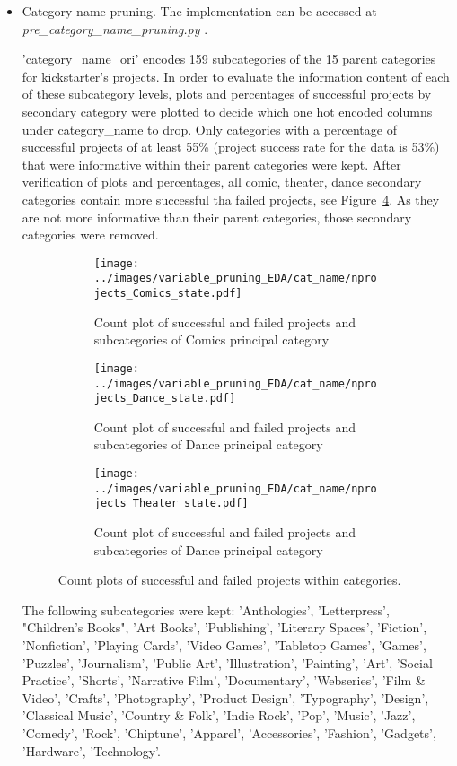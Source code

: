 \documentclass{article}
\begin{document}
{\begin{itemize}
\begin{itemize}
	\item Category name pruning.
	The implementation can be accessed at \emph{pre\_category\_name\_pruning.py }.
	
	'category\_name\_ori' encodes 159 subcategories of the 15 parent categories for kickstarter's projects. In order to evaluate the information content of each of these subcategory levels, plots and percentages of successful projects by secondary category were plotted to decide which one hot encoded columns under category\_name to drop. Only categories with a percentage of successful projects of at least 55\% (project success rate for the data is 53\%) that were informative within their parent categories were kept.
	After verification of plots and percentages, all comic, theater, dance secondary categories contain more successful tha failed projects, see Figure~\ref{fig:countCat}. As they are not more informative than their parent categories, those secondary categories were removed. 
	
\begin{figure}
  \begin{subfigure}[a]{0.8\linewidth}
    \centering\texttt{[image: ../images/variable\_pruning\_EDA/cat\_name/nprojects\_Comics\_state.pdf]}
    \caption{Count plot of successful and failed projects and subcategories of Comics principal category}
    \label{fig:countCatA}
  \end{subfigure}
  \begin{subfigure}[b]{0.8\linewidth}
    \centering\texttt{[image: ../images/variable\_pruning\_EDA/cat\_name/nprojects\_Dance\_state.pdf]}
    \caption{Count plot of successful and failed projects and subcategories of Dance principal category}
    \label{fig:countCatB}
  \end{subfigure}
  \begin{subfigure}[c]{0.8\linewidth}
    \centering\texttt{[image: ../images/variable\_pruning\_EDA/cat\_name/nprojects\_Theater\_state.pdf]}
    \caption{Count plot of successful and failed projects and subcategories of Dance principal category}
    \label{fig:countCatC}
  \end{subfigure}
\caption{Count plots of successful and failed projects within categories.}
\label{fig:countCat}
\end{figure}

	The following subcategories were kept: 'Anthologies', 'Letterpress', "Children's Books", 'Art Books', 'Publishing', 'Literary Spaces', 'Fiction', 'Nonfiction', 'Playing Cards', 'Video Games', 'Tabletop Games', 'Games', 'Puzzles', 'Journalism', 'Public Art', 'Illustration', 'Painting', 'Art', 'Social Practice', 'Shorts', 'Narrative Film', 'Documentary', 'Webseries', 'Film \& Video', 'Crafts', 'Photography', 'Product Design', 'Typography', 'Design', 'Classical Music', 'Country \& Folk', 'Indie Rock', 'Pop', 'Music', 'Jazz', 'Comedy', 'Rock', 'Chiptune', 'Apparel', 'Accessories', 'Fashion', 'Gadgets', 'Hardware', 'Technology'.
	

\end{itemize}
\end{itemize}}
\end{document}
